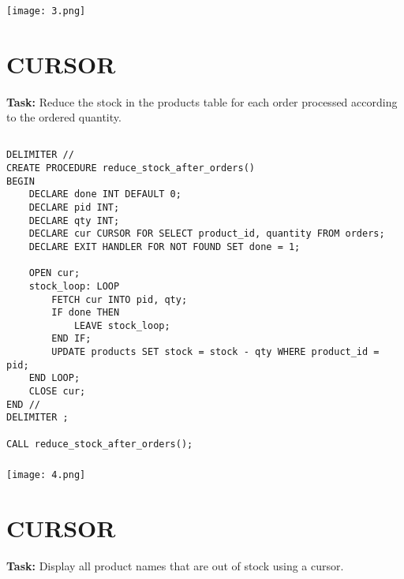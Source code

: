 \documentclass[12pt,a4paper]{article}
\begin{document}
\subsubsection{}
\begin{center}
    \texttt{[image: 3.png]}
\end{center}


\section{CURSOR}
\textbf{Task:} Reduce the stock in the products table for each order processed according to the ordered quantity.

\subsection{}
\begin{lstlisting}
DELIMITER //
CREATE PROCEDURE reduce_stock_after_orders()
BEGIN
    DECLARE done INT DEFAULT 0;
    DECLARE pid INT;
    DECLARE qty INT;
    DECLARE cur CURSOR FOR SELECT product_id, quantity FROM orders;
    DECLARE EXIT HANDLER FOR NOT FOUND SET done = 1;

    OPEN cur;
    stock_loop: LOOP
        FETCH cur INTO pid, qty;
        IF done THEN
            LEAVE stock_loop;
        END IF;
        UPDATE products SET stock = stock - qty WHERE product_id = pid;
    END LOOP;
    CLOSE cur;
END //
DELIMITER ;

CALL reduce_stock_after_orders();

\end{lstlisting}

\subsubsection{}
\begin{center}
    \texttt{[image: 4.png]}
\end{center}


\section{CURSOR}
\textbf{Task:} Display all product names that are out of stock using a cursor.
\end{document}
